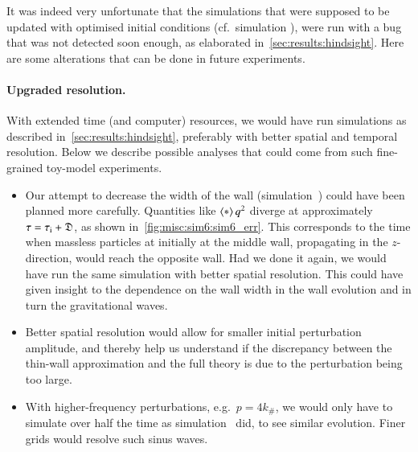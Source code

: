 



It was indeed very unfortunate that the simulations that were supposed to be updated with optimised initial conditions (cf.~simulation ), were run with {a bug that was not detected soon enough}, as elaborated in~\cref{sec:results:hindsight}. Here are some alterations that can be done in future experiments.

\paragraph{Upgraded resolution.} %
With extended time (and computer) resources, we would have run simulations as described in~\cref{sec:results:hindsight}, preferably with better spatial and temporal resolution. Below we describe possible analyses that could come from such fine-grained toy-model experiments.
\begin{itemize}
    \item Our attempt to decrease the width of the wall (simulation~) could have been planned more carefully. Quantities like $\left\langle{*}\right\rangle{q^2}$ diverge at approximately $\tau={\tau_\mathrm{i}+ \mathfrak{D}}$, as shown in~\cref{fig:misc:sim6:sim6_err}. This corresponds to the time when massless particles at initially at the middle wall, propagating in the $z$-direction, would reach the opposite wall. 
    Had we done it again, we would have run the same simulation with better spatial resolution. This could have given insight to the dependence on the wall width in the wall evolution and in turn the gravitational waves.
    \item Better spatial resolution would allow for smaller initial perturbation amplitude, and thereby help us understand if the discrepancy between the thin-wall approximation and the full theory is due to the perturbation being too large.
    \item With higher-frequency perturbations, e.g.~$p=4 k_\#$, we would only have to simulate over half the time as simulation~ did, to see similar evolution. Finer grids would resolve such sinus waves.
\end{itemize}
